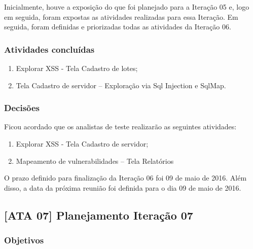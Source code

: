 \documentclass[
    12pt,               %
    openright,          %
    oneside,            %
    a4paper,            %
    section=TITLE,     %
    english,            %
    french,             %
    spanish,            %
    brazil              %
    ]{abntex2}
\begin{document}
Inicialmente, houve a exposição do que foi planejado para a Iteração 05 e, logo em seguida, foram expostas as atividades realizadas para essa Iteração. Em seguida, foram definidas e priorizadas todas as atividades da Iteração 06.



\subsubsection*{Atividades concluídas}


\begin{enumerate}[start=1]
	
\item Explorar XSS - Tela Cadastro de lotes;
	
\item Tela Cadastro de servidor -- Exploração via Sql Injection e SqlMap.

\end{enumerate}


\subsubsection*{Decisões}

Ficou acordado que os analistas de teste realizarão as seguintes atividades:



\begin{enumerate}[start=1]
	
\item Explorar XSS - Tela Cadastro de servidor;
	
\item Mapeamento de vulnerabilidades -- Tela Relatórios

\end{enumerate}

O prazo definido para finalização da Iteração 06 foi 09 de maio de 2016. Além disso, a data da próxima reunião foi definida para o dia 09 de maio de 2016.



\subsection*{{[}ATA 07{]} Planejamento Iteração 07}


\subsubsection*{Objetivos}
\end{document}
